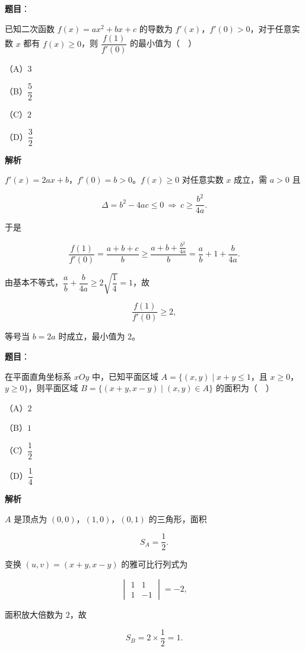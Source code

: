 \begin{answer}

\textbf{题目}：

已知二次函数 $f(x)=ax^2+bx+c$ 的导数为 $f'(x)$，$f'(0)>0$，对于任意实数 $x$ 都有 $f(x)\geqslant0$，则 $\dfrac{f(1)}{f'(0)}$ 的最小值为（　）

（A）$3$

（B）$\dfrac52$

（C）$2$

（D）$\dfrac32$

\textbf{解析}

$f'(x)=2ax+b$，$f'(0)=b>0$。$f(x)\geqslant0$ 对任意实数 $x$ 成立，需 $a>0$ 且

\nopagebreak[4]
\[\Delta=b^2-4ac\leqslant0\ \Rightarrow\ c\geqslant\frac{b^2}{4a}.\]

于是

\nopagebreak[4]
\[\frac{f(1)}{f'(0)}=\frac{a+b+c}{b}\geqslant\frac{a+b+\frac{b^2}{4a}}{b}=\frac ab+1+\frac{b}{4a}.\]

由基本不等式，$\dfrac ab+\dfrac{b}{4a}\geqslant2\sqrt{\dfrac14}=1$，故

\nopagebreak[4]
\[\frac{f(1)}{f'(0)}\geqslant2,\]

等号当 $b=2a$ 时成立，最小值为 $2$。


\end{answer}
\begin{answer}

\textbf{题目}：

在平面直角坐标系 $xOy$ 中，已知平面区域 $A=\{(x,y)\mid x+y\leqslant1$，且 $x\geqslant0$，$y\geqslant0\}$，则平面区域 $B=\{(x+y,x-y)\mid(x,y)\in A\}$ 的面积为（　）

（A）$2$

（B）$1$

（C）$\dfrac12$

（D）$\dfrac14$

\textbf{解析}

$A$ 是顶点为 $(0,0)$，$(1,0)$，$(0,1)$ 的三角形，面积

\nopagebreak[4]
\[S_A=\frac12.\]

变换 $(u,v)=(x+y,x-y)$ 的雅可比行列式为

\nopagebreak[4]
\[\begin{vmatrix}1&1\\1&-1\end{vmatrix}=-2,\]

面积放大倍数为 $2$，故

\nopagebreak[4]
\[S_B=2\times\frac12=1.\]


\end{answer}
